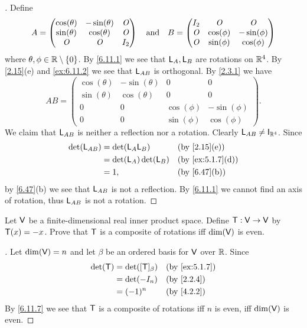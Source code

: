 \begin{proof}[]
  Define
  \[
    A = \begin{pmatrix}
      \cos(\theta) & -\sin(\theta) & \mathit{O} \\
      \sin(\theta) & \cos(\theta)  & \mathit{O} \\
      \mathit{O}          & \mathit{O}           & I_2
    \end{pmatrix} \quad \text{and} \quad B = \begin{pmatrix}
      I_2 & \mathit{O}        & \mathit{O}         \\
      \mathit{O} & \cos(\phi) & -\sin(\phi) \\
      \mathit{O} & \sin(\phi) & \cos(\phi)
    \end{pmatrix}
  \]
  where \(\theta, \phi \in \mathbb{R} \setminus \left\lbrace0\right\rbrace\).
  By \cref{6.11.1} we see that \(\mathsf{L}_A, \mathsf{L}_B\) are rotations on \(\mathbb{R}^4\).
  By \cref{2.15}(e) and \cref{ex:6.11.2} we see that \(\mathsf{L}_{AB}\) is orthogonal.
  By \cref{2.3.1} we have
  \[
    AB = \begin{pmatrix}
      \cos(\theta) & -\sin(\theta) & 0          & 0           \\
      \sin(\theta) & \cos(\theta)  & 0          & 0           \\
      0            & 0             & \cos(\phi) & -\sin(\phi) \\
      0            & 0             & \sin(\phi) & \cos(\phi)
    \end{pmatrix}.
  \]
  We claim that \(\mathsf{L}_{AB}\) is neither a reflection nor a rotation.
  Clearly \(\L_{AB} \neq \IT[\R^4]\).
  Since
  \begin{align*}
    \det(\L_{AB}) & = \det(\L_A \L_B)       &  & \by{2.15}[e]     \\
                  & = \det(\L_A) \det(\L_B) &  & \by{ex:5.1.7}[d] \\
                  & = 1,                    &  & \by{6.47}[b]
  \end{align*}
  by \cref{6.47}(b) we see that \(\mathsf{L}_{AB}\) is not a reflection.
  By \cref{6.11.1} we cannot find an axis of rotation, thus \(\mathsf{L}_{AB}\) is not a rotation.
\end{proof}

\begin{ex}\label{ex:6.11.12}
  Let \(\mathsf{V}\) be a finite-dimensional real inner product space.
  Define \(\mathsf{T} : \mathsf{V} \to \mathsf{V}\) by \(\mathsf{T}(x) = -x\).
  Prove that \(\mathsf{T}\) is a composite of rotations iff \(\dim(\mathsf{V})\) is even.
\end{ex}

\begin{proof}[]
  Let \(\dim(\mathsf{V}) = n\) and let \(\beta\) be an ordered basis for \(\mathsf{V}\) over \(\mathbb{R}\).
  Since
  \begin{align*}
    \det(\T) & = \det([\T]_{\beta}) &  & \by{ex:5.1.7} \\
             & = \det(-I_n)         &  & \by{2.2.4}    \\
             & = (-1)^n             &  & \by{4.2.2}
  \end{align*}
  By \cref{6.11.7} we see that \(\mathsf{T}\) is a composite of rotations iff \(n\) is even, iff \(\dim(\mathsf{V})\) is even.
\end{proof}

